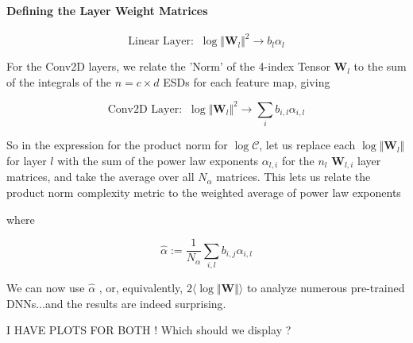 

\paragraph{Defining the Layer Weight Matrices}

$$\text{Linear Layer:}\;\;\log\Vert\mathbf{W}_{l}\Vert^{2}\rightarrow b_{l}\alpha_{l}$$

For the Conv2D layers, we relate the 'Norm' of the 4-index Tensor $\mathbf{W}_{l}$ to the sum of the integrals of the $n=c\times d$ ESDs for each feature map, giving 

$$\text{Conv2D Layer:}\;\;\log\Vert\mathbf{W}_{l}\Vert^{2}\rightarrow \sum_{i}b_{i,l}\alpha_{i,l}$$

So in the expression for the product norm for $\log\mathcal{C}$, let us replace each $\log\Vert\mathbf{W}_{l}\Vert$ for layer $l$ with the sum of the power law exponents $\alpha_{l,i}$ for the $n{_l}$ $\mathbf{W}_{l,i}$ layer matrices, and take the average over all $N_{\alpha}$  matrices.  This lets us relate the product norm complexity metric to the weighted average of power law exponents

where

$$\hat{\alpha}:=\dfrac{1}{N_{\alpha}}\sum_{i,l}b_{i,j}\alpha_{i,l}$$


We can now use $\hat{\alpha}$ ,  or, equivalently, $2\langle\log\Vert\mathbf{W}\Vert\rangle$ to analyze numerous pre-trained DNNs...and the results are indeed surprising.

I HAVE PLOTS FOR BOTH !
Which should we display ?  


